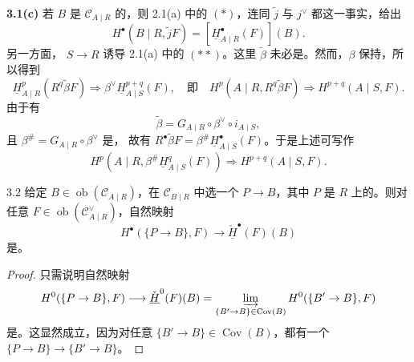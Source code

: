 \textbf{3.1(c)} 若 $B$ 是 $\mathcal C_{A\mid R}$ 的，则 2.1(a) 中的 $(*)$，连同 $\widetilde j$ 与 $j^{\vee}$ 都这一事实，给出
\[H^{\bullet}(B\mid R,\widetilde jF)=[\underline H^{\bullet}_{A\mid R}(F)](B).\]
另一方面， $S\to R$ 诱导 2.1(a) 中的 $(**)$。这里 $\widetilde\beta$ 未必是。然而，$\beta$ 保持，所以得到
\[
\underline H^p_{A\mid R}(R^q\widetilde\beta F)\Longrightarrow\beta^{\vee}\underline H^{p+q}_{A\mid S}(F),
\quad\text{即}\quad
H^p(A\mid R,R^q\widetilde\beta F)\Longrightarrow H^{p+q}(A\mid S,F).
\]
由于有
\[\widetilde\beta=G_{A\mid R}\circ\beta^{\vee}\circ i_{A\mid S},\]
且 $\beta^{\#}=G_{A\mid R}\circ\beta^{\vee}$ 是，
故有 $R^{\bullet}\widetilde\beta F=\beta^{\#}\underline H^{\bullet}_{A\mid S}(F)$。于是上述可写作
\[H^p(A\mid R,\beta^{\#}\underline H^q_{A\mid S}(F))\Longrightarrow H^{p+q}(A\mid S,F).\]

\begin{SGAresult}{}{3.2}
给定 $B\in\operatorname{ob}(\mathcal C_{A\mid R})$，在 $\mathcal C_{B\mid R}$ 中选一个 $P\to B$，其中 $P$ 是 $R$ 上的。则对任意 $F\in\operatorname{ob}(\mathcal C_{A\mid R}^{\vee})$，自然映射
\[H^{\bullet}(\{P\to B\},F)\longrightarrow\check{\underline H}^{\bullet}(F)(B)\]
是。
\end{SGAresult}
\begin{proof}
只需说明自然映射
\[
H^0(\{P\to B\},F)\longrightarrow\check{\underline H}^0(F)(B)
=\varinjlim_{\{B'\to B\}\in\operatorname{Cov}(B)}H^0(\{B'\to B\},F)
\]
是。这显然成立，因为对任意 $\{B'\to B\}\in\operatorname{Cov}(B)$，都有一个 $\{P\to B\}\to\{B'\to B\}$。
\end{proof}

